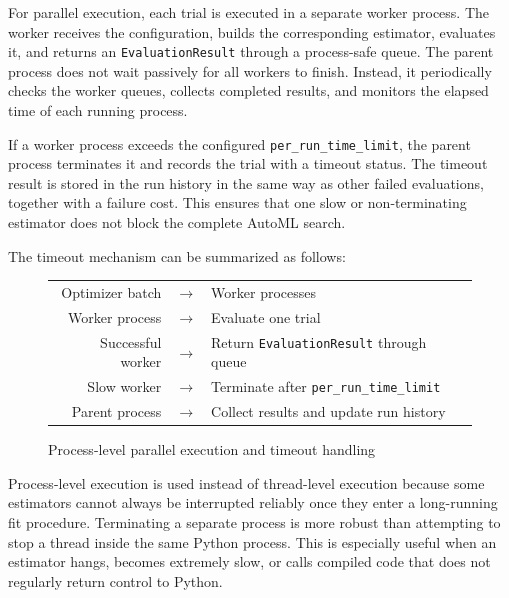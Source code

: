 \documentclass[12pt,a4paper,oneside]{report}
\begin{document}
\noindent For parallel execution, each trial is executed in a separate worker process. The
worker receives the configuration, builds the corresponding estimator, evaluates
it, and returns an \texttt{EvaluationResult} through a process-safe queue. The
parent process does not wait passively for all workers to finish. Instead, it
periodically checks the worker queues, collects completed results, and monitors
the elapsed time of each running process.

\noindent If a worker process exceeds the configured
\texttt{per\_run\_time\_limit}, the parent process terminates it and records the
trial with a timeout status. The timeout result is stored in the run history in
the same way as other failed evaluations, together with a failure cost. This
ensures that one slow or non-terminating estimator does not block the complete
AutoML search.

\noindent The timeout mechanism can be summarized as follows:

\begin{figure}[H]
\centering
\renewcommand{\arraystretch}{1.25}
\begin{tabular}{rcl}
Optimizer batch
& \(\longrightarrow\) &
Worker processes \\

Worker process
& \(\longrightarrow\) &
Evaluate one trial \\

Successful worker
& \(\longrightarrow\) &
Return \texttt{EvaluationResult} through queue \\

Slow worker
& \(\longrightarrow\) &
Terminate after \texttt{per\_run\_time\_limit} \\

Parent process
& \(\longrightarrow\) &
Collect results and update run history \\
\end{tabular}
\caption{Process-level parallel execution and timeout handling}
\label{fig:parallel-timeout-control}
\end{figure}

\noindent Process-level execution is used instead of thread-level execution because some
estimators cannot always be interrupted reliably once they enter a long-running
fit procedure. Terminating a separate process is more robust than attempting to
stop a thread inside the same Python process. This is especially useful when an
estimator hangs, becomes extremely slow, or calls compiled code that does not
regularly return control to Python.
\end{document}
